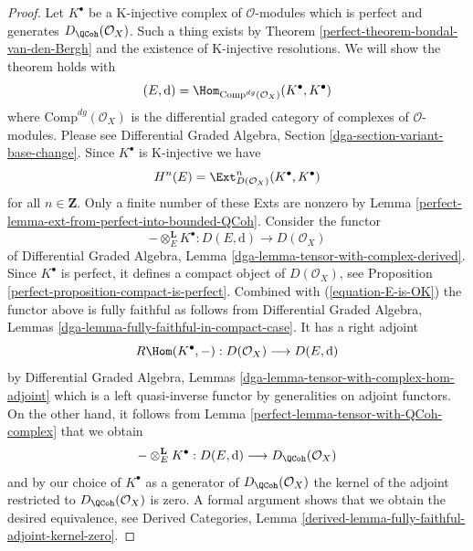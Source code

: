 \begin{proof}

Let $K^\bullet$ be a K-injective complex of $\mathcal{O}$-modules which
is perfect and generates $D_\QCoh(\mathcal{O}_X)$. Such a
thing exists by Theorem \ref{perfect-theorem-bondal-van-den-Bergh}
and the existence of K-injective resolutions. We will show the
theorem holds with
$$
(E, \text{d}) = \Hom_{\text{Comp}^{dg}(\mathcal{O}_X)}(K^\bullet, K^\bullet)
$$
where $\text{Comp}^{dg}(\mathcal{O}_X)$ is the differential graded category
of complexes of $\mathcal{O}$-modules. Please see
Differential Graded Algebra, Section \ref{dga-section-variant-base-change}.
Since $K^\bullet$ is K-injective we
have
\begin{equation}
\label{equation-E-is-OK}
H^n(E) = \Ext^n_{D(\mathcal{O}_X)}(K^\bullet, K^\bullet)
\end{equation}
for all $n \in \mathbf{Z}$. Only a finite number of these Exts
are nonzero by Lemma \ref{perfect-lemma-ext-from-perfect-into-bounded-QCoh}.
Consider the functor
$$
- \otimes_E^\mathbf{L} K^\bullet :
D(E, \text{d}) \longrightarrow D(\mathcal{O}_X)
$$
of
Differential Graded Algebra, Lemma
\ref{dga-lemma-tensor-with-complex-derived}.
Since $K^\bullet$ is perfect, it defines a compact object of
$D(\mathcal{O}_X)$, see Proposition \ref{perfect-proposition-compact-is-perfect}.
Combined with (\ref{equation-E-is-OK}) the functor above is fully
faithful as follows from
Differential Graded Algebra, Lemmas
\ref{dga-lemma-fully-faithful-in-compact-case}. It has a right adjoint
$$
R\Hom(K^\bullet, - ) : D(\mathcal{O}_X) \longrightarrow D(E, \text{d})
$$
by Differential Graded Algebra, Lemmas
\ref{dga-lemma-tensor-with-complex-hom-adjoint}
which is a left quasi-inverse functor by generalities on adjoint
functors. On the other hand, it follows from
Lemma \ref{perfect-lemma-tensor-with-QCoh-complex} that we obtain
$$
- \otimes_E^\mathbf{L} K^\bullet :
D(E, \text{d}) \longrightarrow D_\QCoh(\mathcal{O}_X)
$$
and by our choice of $K^\bullet$ as a generator of
$D_\QCoh(\mathcal{O}_X)$ the kernel of the adjoint
restricted to $D_\QCoh(\mathcal{O}_X)$ is zero.
A formal argument shows that we obtain the desired equivalence, see
Derived Categories, Lemma
\ref{derived-lemma-fully-faithful-adjoint-kernel-zero}.
\end{proof}

